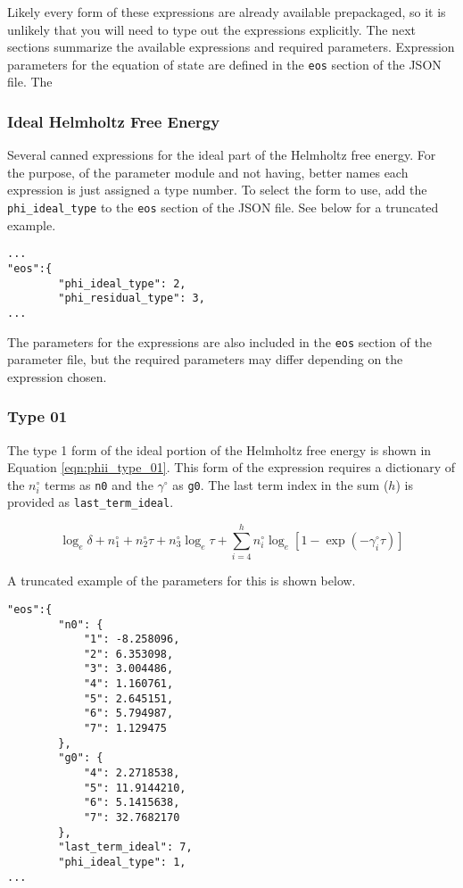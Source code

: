 \documentclass[oneside]{book}
\begin{document}
Likely every form of these expressions are already available prepackaged, so it is unlikely that you will need to type out the expressions explicitly.  The next sections summarize the available expressions and required parameters.  Expression parameters for the equation of state are defined in the \texttt{eos} section of the JSON file.  The 

\subsubsection{Ideal Helmholtz Free Energy} 

Several canned expressions for the ideal part of the Helmholtz free energy.  For the purpose, of the parameter module and not having, better names each
expression is just assigned a type number.  To select the form to use, add the \texttt{phi\_ideal\_type} to the \texttt{eos} section of the JSON file.  See below for a truncated example.

\begin{verbatim}
...
"eos":{
        "phi_ideal_type": 2,
        "phi_residual_type": 3,
...
\end{verbatim}

The parameters for the expressions are also included in the \texttt{eos} section of the parameter file, but the required parameters may differ depending on the expression chosen.

\subsubsection{Type 01}

The type 1 form of the ideal portion of the Helmholtz free energy is shown in Equation \ref{eqn:phii_type_01}.  This form of the expression requires a dictionary of the $n^\circ_i$ terms as \texttt{n0} and the $\gamma^\circ$ as \texttt{g0}.  The last term index in the sum ($h$) is provided as \texttt{last\_term\_ideal}.  

\begin{equation}\label{eqn:phii_type_01}
	\log_e \delta + n^\circ_1 + n^\circ_2 \tau + n^\circ_3 \log_e \tau + \sum_{i = 4}^h n^\circ_i \log_e \left[ 1 - \exp(-\gamma^\circ_i  \tau)\right]
\end{equation}

A truncated example of the parameters for this is shown below.

\begin{verbatim}
"eos":{
        "n0": {
            "1": -8.258096,
            "2": 6.353098,
            "3": 3.004486,
            "4": 1.160761,
            "5": 2.645151,
            "6": 5.794987,
            "7": 1.129475
        },
        "g0": {
            "4": 2.2718538,
            "5": 11.9144210,
            "6": 5.1415638,
            "7": 32.7682170
        },
        "last_term_ideal": 7,
        "phi_ideal_type": 1,
...
\end{verbatim} 
\end{document}
